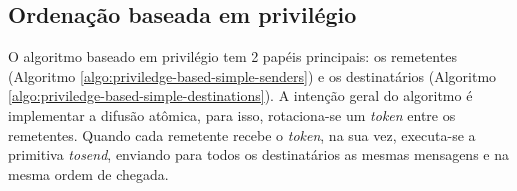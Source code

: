 

\subsection{Ordenação baseada em privilégio}

O algoritmo baseado em privilégio \cite{journals/csur/DefagoSU04} tem 2 papéis principais: os remetentes (Algoritmo \ref{algo:priviledge-based-simple-senders}) e os destinatários (Algoritmo \ref{algo:priviledge-based-simple-destinations}). A intenção geral do algoritmo é implementar a difusão atômica, para isso, rotaciona-se um \textit{token} entre os remetentes. Quando cada remetente recebe o \textit{token}, na sua vez, executa-se a primitiva \textit{tosend}, enviando para todos os destinatários as mesmas mensagens e na mesma ordem de chegada.


